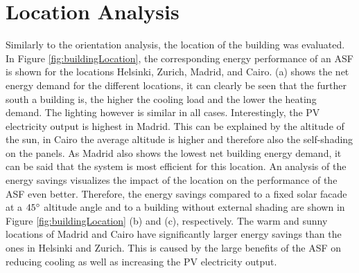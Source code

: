 
\section{Location Analysis}

	Similarly to the orientation analysis, the location of the building was evaluated. In Figure \ref{fig:buildingLocation}, the corresponding energy performance of an ASF is shown for the locations Helsinki, Zurich, Madrid, and Cairo. (a) shows the net energy demand for the different locations, it can clearly be seen that the further south a building is, the higher the cooling load and the lower the heating demand. The lighting however is similar in all cases. Interestingly, the PV electricity output is highest in Madrid. This can be explained by the altitude of the sun, in Cairo the average altitude is higher and therefore also the self-shading on the panels. As Madrid also shows the lowest net building energy demand, it can be said that the system is most efficient for this location. An analysis of the energy savings visualizes the impact of the location on the performance of the ASF even better. Therefore, the energy savings compared to a fixed solar facade at a $45\degree$ altitude angle and to a building without external shading are shown in Figure \ref{fig:buildingLocation} (b) and (c), respectively. The warm and sunny locations of Madrid and Cairo have significantly larger energy savings than the ones in Helsinki and Zurich. This is caused by the large benefits of the ASF on reducing cooling as well as increasing the PV electricity output. 


